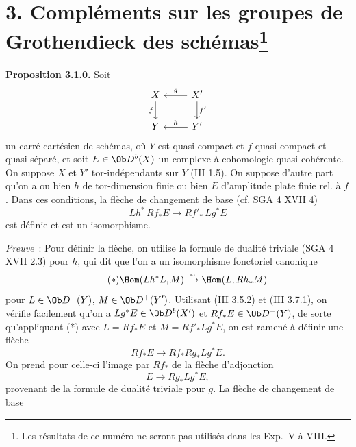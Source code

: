 \section*{3. Compléments sur les groupes de Grothendieck des schémas\protect\footnote{Les résultats de ce numéro ne seront pas utilisés dans les Exp.\ V à VIII.}}

\textbf{Proposition 3.1.0.} Soit
\[
\begin{tikzcd}
X \arrow[d,"f"'] & X' \arrow[l,"g"']\arrow[d,"f'"]\\
Y & Y' \arrow[l,"h"']
\end{tikzcd}
\]
un carré cartésien de schémas, où \(Y\) est quasi-compact et \(f\) quasi-compact et quasi-séparé, et soit \(E\in\Ob D^b(X)\) un complexe à cohomologie quasi-cohérente. On suppose \(X\) et \(Y'\) tor-indépendants sur \(Y\) (III 1.5). On suppose d'autre part qu'on a ou bien \(h\) de tor-dimension finie ou bien \(E\) d'amplitude plate finie rel. à \(f\). Dans ces conditions, la flèche de changement de base (cf. SGA 4 XVII 4)
\[
 Lh^*\,Rf_*E\longrightarrow Rf'_*\,Lg^*E
\]
est définie et est un isomorphisme.

\emph{Preuve}~: Pour définir la flèche, on utilise la formule de dualité triviale (SGA 4 XVII 2.3) pour \(h\), qui dit que l'on a un isomorphisme fonctoriel canonique
\begin{equation}\tag{$*$}
 \Hom(Lh^*L,M)\xrightarrow{\sim}\Hom(L,Rh_*M)
\end{equation}
pour \(L\in\Ob D^-(Y)\), \(M\in\Ob D^+(Y')\). Utilisant (III 3.5.2) et (III 3.7.1), on vérifie facilement qu'on a \(Lg^*E\in\Ob D^b(X')\) et \(Rf_*E\in\Ob D^-(Y)\), de sorte qu'appliquant (*) avec \(L=Rf_*E\) et \(M=Rf'_*Lg^*E\), on est ramené à définir une flèche
\[
 Rf_*E\longrightarrow Rf_*Rg_*Lg^*E.
\]
On prend pour celle-ci l'image par \(Rf_*\) de la flèche d'adjonction
\[
 E\longrightarrow Rg_*Lg^*E,
\]
provenant de la formule de dualité triviale pour \(g\). La flèche de changement de base 
